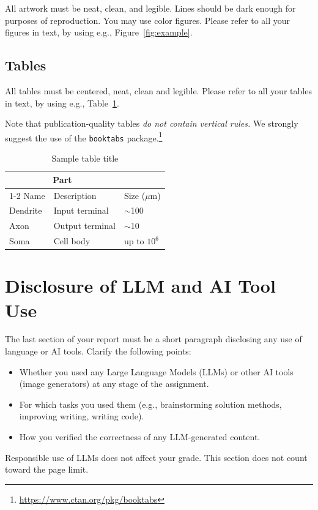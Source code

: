All artwork must be neat, clean, and legible. Lines should be dark enough for
purposes of reproduction. You may use color figures. Please refer to all your figures in text, by using e.g., Figure~\ref{fig:example}. 

\subsection{Tables}
All tables must be centered, neat, clean and legible. Please refer to all your tables in text, by using e.g., Table~\ref{tab:example}.

Note that publication-quality tables \emph{do not contain vertical rules.} We
strongly suggest the use of the \verb+booktabs+ package.\footnote{\url{https://www.ctan.org/pkg/booktabs}}

\begin{table}[h]
  \caption{Sample table title}
  \label{tab:example}
  \centering
  \begin{tabular}{lll}
    \toprule
    \multicolumn{2}{c}{Part}                   \\
    \cmidrule(r){1-2}
    Name     & Description     & Size ($\mu$m) \\
    \midrule
    Dendrite & Input terminal  & $\sim$100     \\
    Axon     & Output terminal & $\sim$10      \\
    Soma     & Cell body       & up to $10^6$  \\
    \bottomrule
  \end{tabular}
\end{table}


\section{Disclosure of LLM and AI Tool Use}

The last section of your report must be a short paragraph disclosing any use of language or AI tools. Clarify the following points:
\begin{itemize}
    \item Whether you used any Large Language Models (LLMs) or other AI tools (image generators) at any stage of the assignment.
    \item For which tasks you used them (e.g., brainstorming solution methods, improving writing, writing code).
    \item How you verified the correctness of any LLM-generated content.
\end{itemize}
 Responsible use of LLMs does not affect your grade. This section does not count toward the page limit. 
